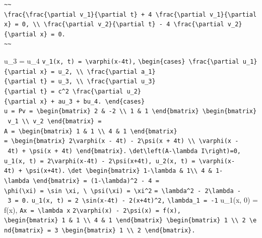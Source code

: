 \documentclass[
  ukrainian,
]{article}
\begin{document}
\begin{verbatim}
~~
\frac{\frac{\partial v_1}{\partial t} + 4 \frac{\partial v_1}{\partial x} = 0, \\ \frac{\partial v_2}{\partial t} - 4 \frac{\partial v_2}{\partial x} = 0.
~~
\end{verbatim}

u\_3 = u\_4 \texttt{v\_1(x,\ t)\ =\ \textbackslash{}varphi(x-4t),}
\texttt{\textbackslash{}begin\{cases\}\ \textbackslash{}frac\{\textbackslash{}partial\ u\_1\}\{\textbackslash{}partial\ x\}\ =\ u\_2,\ \textbackslash{}\textbackslash{}\ \textbackslash{}frac\{\textbackslash{}partial\ a\_1\}\{\textbackslash{}partial\ t\}\ =\ u\_3,\ \textbackslash{}\textbackslash{}\ \textbackslash{}frac\{\textbackslash{}partial\ u\_3\}\{\textbackslash{}partial\ t\}\ =\ c\^{}2\ \textbackslash{}frac\{\textbackslash{}partial\ u\_2\}\{\textbackslash{}partial\ x\}\ +\ au\_3\ +\ bu\_4.\ \textbackslash{}end\{cases\}}
\texttt{u\ =\ Pv\ =\ \textbackslash{}begin\{bmatrix\}\ 2\ \&\ -2\ \textbackslash{}\textbackslash{}\ 1\ \&\ 1\ \textbackslash{}end\{bmatrix\}\ \textbackslash{}begin\{bmatrix\}\ v\_1\ \textbackslash{}\textbackslash{}\ v\_2\ \textbackslash{}end\{bmatrix\}\ =}
\texttt{A\ =\ \textbackslash{}begin\{bmatrix\}\ 1\ \&\ 1\ \textbackslash{}\textbackslash{}\ 4\ \&\ 1\ \textbackslash{}end\{bmatrix\}}
\texttt{=\ \textbackslash{}begin\{bmatrix\}\ 2\textbackslash{}varphi(x\ -\ 4t)\ -\ 2\textbackslash{}psi(x\ +\ 4t)\ \textbackslash{}\textbackslash{}\ \textbackslash{}varphi(x\ -\ 4t)\ +\ \textbackslash{}psi(x\ +\ 4t)\ \textbackslash{}end\{bmatrix\}.}
\texttt{\textbackslash{}det\textbackslash{}left(A-\textbackslash{}lambda\ I\textbackslash{}right)=0,}
\texttt{u\_1(x,\ t)\ =\ 2\textbackslash{}varphi(x-4t)\ -\ 2\textbackslash{}psi(x+4t),\ u\_2(x,\ t)\ =\ \textbackslash{}varphi(x-4t)\ +\ \textbackslash{}psi(x+4t).}
\texttt{\textbackslash{}det\ \textbackslash{}begin\{bmatrix\}\ 1-\textbackslash{}lambda\ \&\ 1\textbackslash{}\textbackslash{}\ 4\ \&\ 1-\textbackslash{}lambda\ \textbackslash{}end\{bmatrix\}\ =\ (1-\textbackslash{}lambda)\^{}2\ -\ 4\ =}
\texttt{\textbackslash{}phi(\textbackslash{}xi)\ =\ \textbackslash{}sin\ \textbackslash{}xi,\ \textbackslash{}\ \textbackslash{}psi(\textbackslash{}xi)\ =\ \textbackslash{}xi\^{}2}
\texttt{=\ \textbackslash{}lambda\^{}2\ -\ 2\textbackslash{}lambda\ -\ 3\ =\ 0.}
\texttt{u\_1(x,\ t)\ =\ 2\ \textbackslash{}sin(x-4t)\ -\ 2(x+4t)\^{}2,}
\texttt{\textbackslash{}lambda\_1\ =\ -1} u\_1(x, 0) = f(x),
\texttt{Ax\ =\ \textbackslash{}lambda\ x}
\texttt{2\textbackslash{}varphi(x)\ -\ 2\textbackslash{}psi(x)\ =\ f(x),}
\texttt{\textbackslash{}begin\{bmatrix\}\ 1\ \&\ 1\ \textbackslash{}\textbackslash{}\ 4\ \&\ 1\ \textbackslash{}end\{bmatrix\}\ \textbackslash{}begin\{bmatrix\}\ 1\ \textbackslash{}\textbackslash{}\ 2\ \textbackslash{}end\{bmatrix\}\ =\ 3\ \textbackslash{}begin\{bmatrix\}\ 1\ \textbackslash{}\textbackslash{}\ 2\ \textbackslash{}end\{bmatrix\}.}
\end{document}
